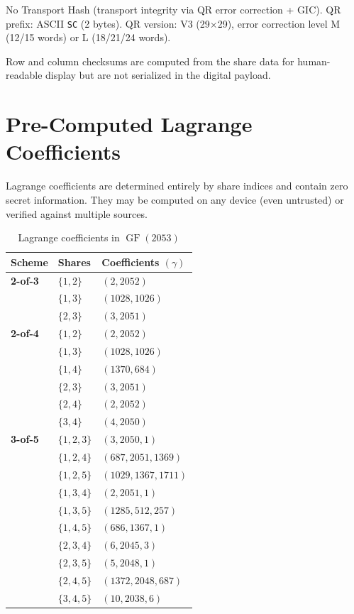 \documentclass[11pt]{article}
\newcommand{\GF}{\operatorname{GF}}
\begin{document}
No Transport Hash (transport integrity via QR error correction + GIC). QR prefix: ASCII \texttt{SC} (2 bytes). QR version: V3 (29$\times$29), error correction level M (12/15 words) or L (18/21/24 words).

Row and column checksums are computed from the share data for human-readable display but are not serialized in the digital payload.

\section{Pre-Computed Lagrange Coefficients}
\label{app:lagrange}

Lagrange coefficients are determined entirely by share indices and contain zero secret information. They may be computed on any device (even untrusted) or verified against multiple sources.

\begin{table}[ht!]
\centering
\caption{Lagrange coefficients in $\GF(2053)$}
\label{tab:lagrange}
\small
\begin{tabular}{@{}llp{4.5cm}@{}}
\toprule
\textbf{Scheme} & \textbf{Shares} & \textbf{Coefficients $(\gamma)$} \\ \midrule
\textbf{2-of-3} & $\{1, 2\}$ & $(2, 2052)$ \\
                & $\{1, 3\}$ & $(1028, 1026)$ \\
                & $\{2, 3\}$ & $(3, 2051)$ \\ \midrule
\textbf{2-of-4} & $\{1, 2\}$ & $(2, 2052)$ \\
                & $\{1, 3\}$ & $(1028, 1026)$ \\
                & $\{1, 4\}$ & $(1370, 684)$ \\
                & $\{2, 3\}$ & $(3, 2051)$ \\
                & $\{2, 4\}$ & $(2, 2052)$ \\
                & $\{3, 4\}$ & $(4, 2050)$ \\ \midrule
\textbf{3-of-5} & $\{1, 2, 3\}$ & $(3, 2050, 1)$ \\
                & $\{1, 2, 4\}$ & $(687, 2051, 1369)$ \\
                & $\{1, 2, 5\}$ & $(1029, 1367, 1711)$ \\
                & $\{1, 3, 4\}$ & $(2, 2051, 1)$ \\
                & $\{1, 3, 5\}$ & $(1285, 512, 257)$ \\
                & $\{1, 4, 5\}$ & $(686, 1367, 1)$ \\
                & $\{2, 3, 4\}$ & $(6, 2045, 3)$ \\
                & $\{2, 3, 5\}$ & $(5, 2048, 1)$ \\
                & $\{2, 4, 5\}$ & $(1372, 2048, 687)$ \\
                & $\{3, 4, 5\}$ & $(10, 2038, 6)$ \\
\bottomrule
\end{tabular}
\end{table}
\end{document}
